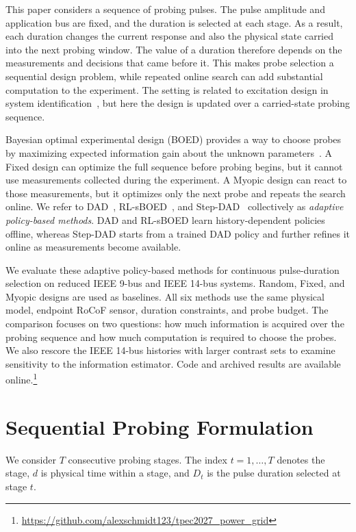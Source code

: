 \documentclass[conference,letterpaper]{IEEEtran}
\begin{document}
This paper considers a sequence of probing pulses. The pulse amplitude and application bus are fixed, and the duration is selected at each stage. As a result, each duration changes the current response and also the physical state carried into the next probing window. The value of a duration therefore depends on the measurements and decisions that came before it. This makes probe selection a sequential design problem, while repeated online search can add substantial computation to the experiment. The setting is related to excitation design in system identification~\cite{hjalmarsson2009identification}, but here the design is updated over a carried-state probing sequence.

Bayesian optimal experimental design (BOED) provides a way to choose probes by maximizing expected information gain about the unknown parameters~\cite{huan2016sequential}. A Fixed design can optimize the full sequence before probing begins, but it cannot use measurements collected during the experiment. A Myopic design can react to those measurements, but it optimizes only the next probe and repeats the search online. We refer to DAD~\cite{foster2021dad}, RL-sBOED~\cite{blau2022rlsboed}, and Step-DAD~\cite{hedman2025stepdad} collectively as \emph{adaptive policy-based methods}. DAD and RL-sBOED learn history-dependent policies offline, whereas Step-DAD starts from a trained DAD policy and further refines it online as measurements become available.

We evaluate these adaptive policy-based methods for continuous pulse-duration selection on reduced IEEE 9-bus and IEEE 14-bus systems. Random, Fixed, and Myopic designs are used as baselines. All six methods use the same physical model, endpoint RoCoF sensor, duration constraints, and probe budget. The comparison focuses on two questions: how much information is acquired over the probing sequence and how much computation is required to choose the probes. We also rescore the IEEE 14-bus histories with larger contrast sets to examine sensitivity to the information estimator. Code and archived results are available online.\footnote{\url{https://github.com/alexschmidt123/tpec2027_power_grid}}

\section{Sequential Probing Formulation}\label{sec:problem}
We consider $T$ consecutive probing stages. The index $t=1,\ldots,T$ denotes the stage, $d$ is physical time within a stage, and $D_t$ is the pulse duration selected at stage $t$.
\end{document}

